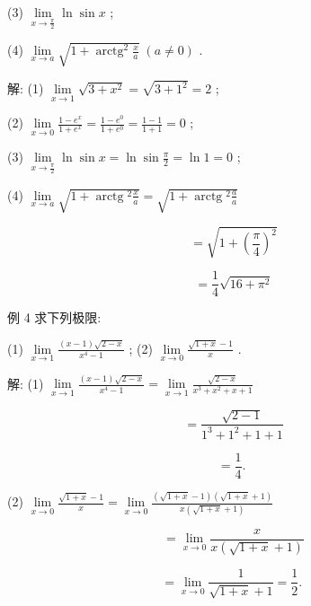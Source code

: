\documentclass[lang=cn,newtx,10pt,scheme=chinese]{elegantbook}
\begin{document}
(3) \(\mathop{\lim }\limits_{{x \rightarrow \frac{\pi }{2}}}\ln \sin x\) ;

(4) \(\mathop{\lim }\limits_{{x \rightarrow a}}\sqrt{1 + {\operatorname{arctg}}^{2}\frac{x}{a}}\;\left( {a \neq 0}\right)\) .

解: (1) \(\mathop{\lim }\limits_{{x \rightarrow 1}}\sqrt{3 + {x}^{2}} = \sqrt{3 + {1}^{2}} = 2\) ;

(2) \(\mathop{\lim }\limits_{{x \rightarrow 0}}\frac{1 - {e}^{x}}{1 + {e}^{x}} = \frac{1 - {e}^{0}}{1 + {e}^{0}} = \frac{1 - 1}{1 + 1} = 0\) ;

(3) \(\mathop{\lim }\limits_{{x \rightarrow \frac{\pi }{2}}}\ln \sin x = \ln \sin \frac{\pi }{2} = \ln 1 = 0\) ;

(4) \(\mathop{\lim }\limits_{{x \rightarrow a}}\sqrt{1 + \operatorname{arctg}{}^{2}\frac{x}{a}} = \sqrt{1 + \operatorname{arctg}{}^{2}\frac{a}{a}}\)

\[
= \sqrt{1 + {\left( \frac{\pi }{4}\right) }^{2}}
\]

\[
= \frac{1}{4}\sqrt{{16} + {\pi }^{2}}
\]

例 4 求下列极限:

(1) \(\mathop{\lim }\limits_{{x \rightarrow 1}}\frac{\left( {x - 1}\right) \sqrt{2 - x}}{{x}^{4} - 1}\) ; (2) \(\mathop{\lim }\limits_{{x \rightarrow 0}}\frac{\sqrt{1 + x} - 1}{x}\) .

解: (1) \(\mathop{\lim }\limits_{{x \rightarrow 1}}\frac{\left( {x - 1}\right) \sqrt{2 - x}}{{x}^{4} - 1} = \mathop{\lim }\limits_{{x \rightarrow 1}}\frac{\sqrt{2 - x}}{{x}^{3} + {x}^{2} + x + 1}\)

\[
= \frac{\sqrt{2 - 1}}{{1}^{3} + {1}^{2} + 1 + 1}
\]

\[
= \frac{1}{4}\text{. }
\]

(2) \(\mathop{\lim }\limits_{{x \rightarrow 0}}\frac{\sqrt{1 + x} - 1}{x} = \mathop{\lim }\limits_{{x \rightarrow 0}}\frac{\left( {\sqrt{1 + x} - 1}\right) \left( {\sqrt{1 + x} + 1}\right) }{x\left( {\sqrt{1 + x} + 1}\right) }\)

\[
= \mathop{\lim }\limits_{{x \rightarrow 0}}\frac{x}{x\left( {\sqrt{1 + x} + 1}\right) }
\]

\[
= \mathop{\lim }\limits_{{x \rightarrow 0}}\frac{1}{\sqrt{1 + x} + 1} = \frac{1}{2}\text{. }
\]
\end{document}
